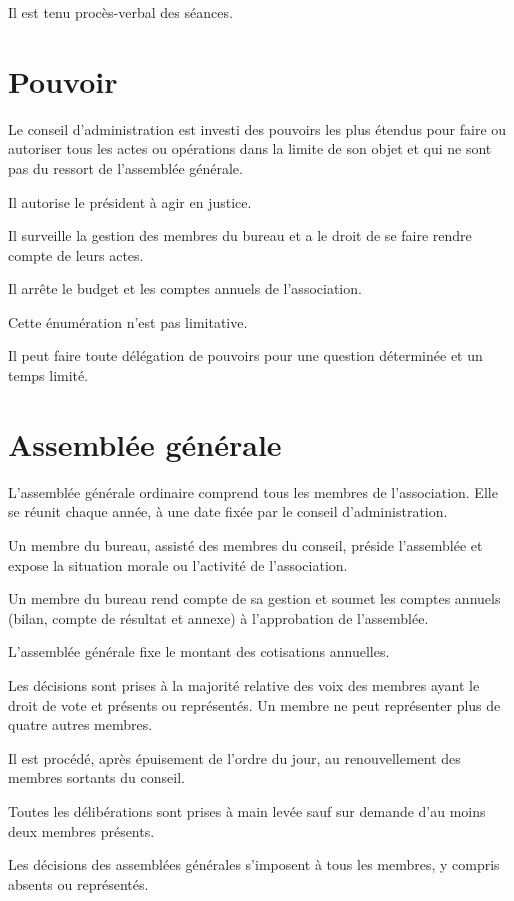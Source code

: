 \documentclass[12 pt]{article}
\begin{document}
Il est tenu procès-verbal des séances.

\section{Pouvoir}
\label{sec:pouvoir}

Le conseil d'administration est investi des pouvoirs les plus étendus
pour faire ou autoriser tous les actes ou opérations dans la limite de
son objet et qui ne sont pas du ressort de l'assemblée générale.

Il autorise le président à agir en justice.

Il surveille la gestion des membres du bureau et a le droit de se
faire rendre compte de leurs actes.

Il arrête le budget et les comptes annuels de l'association.

Cette énumération n'est pas limitative.

Il peut faire toute délégation de pouvoirs pour une question
déterminée et un temps limité.

\section{Assemblée générale}
\label{sec:assemblee-generale}


L’assemblée générale ordinaire comprend tous les membres de
l’association. Elle se réunit chaque année, à une date fixée par le
conseil d’administration.

Un membre du bureau, assisté des
membres du conseil, préside l’assemblée et expose la situation morale
ou l’activité de l’association.

Un membre du bureau rend compte de
sa gestion et soumet les comptes annuels (bilan, compte de résultat et
annexe) à l’approbation de l’assemblée.

L’assemblée générale fixe le montant des cotisations annuelles.

Les décisions sont prises à la majorité relative des voix des membres
ayant le droit de vote et présents ou représentés. Un membre ne peut
représenter plus de quatre autres membres.

Il est procédé, après épuisement de l’ordre du jour, au renouvellement
des membres sortants du conseil.

Toutes les délibérations sont prises à main levée sauf sur demande
d’au moins deux membres présents.

Les décisions des assemblées générales s’imposent à tous les membres,
y compris absents ou représentés.
\end{document}
